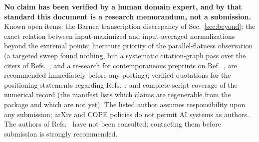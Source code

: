 \documentclass[10pt,twocolumn]{article}
\begin{document}
\textbf{No claim has been verified by a human domain expert, and by that standard this document is a research memorandum, not a submission.} Known open items: the Barnea transcription discrepancy of Sec.~\ref{sec:beyond}; the exact relation between input-maximized and input-averaged normalizations beyond the extremal points; literature priority of the parallel-flatness observation (a targeted sweep found nothing, but a systematic citation-graph pass over the citers of Refs.~\cite{Bancal2012,Brito2018}, and a re-search for contemporaneous preprints on Ref.~\cite{Li2026}, are recommended immediately before any posting); verified quotations for the positioning statements regarding Refs.~\cite{Salart2008,Bancal2012}; and complete script coverage of the numerical record (the manifest lists which claims are regenerable from the package and which are not yet). The listed author assumes responsibility upon any submission; arXiv and COPE policies do not permit AI systems as authors. The authors of Refs.~\cite{Li2026,Brito2018,Barnea2013} have not been consulted; contacting them before submission is strongly recommended.
\end{document}
